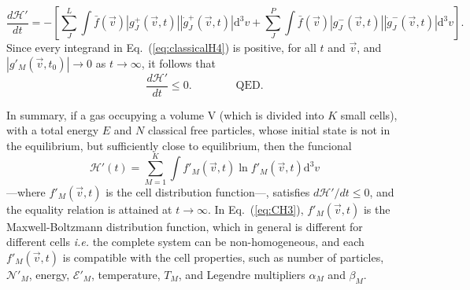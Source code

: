 %
\begin{equation}\label{eq:classicalH4}
    \frac{d\mathcal{H}'}{dt}=-\left[
      \sum_J^{L}\int\bar f(\vec{v})|g_J^{+}(\vec{v},t)|
        |\dot g_J^{+}(\vec{v},t)|\mathrm{d}^3v
      +\sum_J^{P}\int\bar f(\vec{v})|g_J^{-}(\vec{v},t)|
      |\dot g_J^{-}(\vec{v},t)|\mathrm{d}^3v 
    \right].
\end{equation}
%
Since every integrand in Eq.~(\ref{eq:classicalH4}) is positive,
for all $t$ and $\vec v$, and
$\left|g'_M(\vec{v},t_0)\right|\to 0$ as $t\to\infty$, it follows that
%
\begin{equation}\label{eq:dHpdtleq0}
 \frac{d\mathcal{H}'}{dt}\leq0.\qquad\qquad\textrm{QED.}
\end{equation}
%

In summary, if a gas occupying a volume V (which is divided into $K$ small cells), with a
total energy $E$ and $N$ classical free particles, whose initial state is not in the equilibrium,
but sufficiently close to equilibrium, then the funcional
%
\begin{equation}\label{eq:CH3}
   \mathcal{H}'(t)=\sum_{M=1}^{K}\int f'_M(\vec{v},t) \ln f'_M(\vec{v},t)\mathrm{d}^3v
\end{equation}
%
---where $f'_M(\vec{v},t)$ is the cell distribution function---,
satisfies $d\mathcal{H}'/dt\leq0$, and the equality relation is attained at $t\to\infty$.
In Eq.~(\ref{eq:CH3}), $f'_M(\vec{v},t)$ is the Maxwell-Boltzmann distribution
function, which in general is different for different cells \textit{i.e.} the complete system
can be non-homogeneous, and each $f'_M(\vec v,t)$ is compatible
with the cell properties, such as number of particles, $\mathcal{N}'_M$, energy, $\mathcal{E}'_M$, temperature,
$T_M$, and Legendre multipliers $\alpha_M$ and $\beta_M$. 


\begin{comment}
Joining both results, we can say the following statement:
Consider a classical gas in a total volume $V$ (divided in $K$ cells of equal
volume elements), total energy $E$ and total number of free particles $N$.
Consider also the system has inhomogeneities and suffers a relaxation process.
If we define the following functional
%
\begin{equation}\label{CH3}
   \mathcal{H}'(t)=\sum_{M=1}^{K}\int f_M(\vec{v},t) \ln f_M(\vec{v},t)\mathrm{d}^3v,
\end{equation}
%
where $f_M(\vec{v},t)$ is the local distribution function of each cell in the
system, then in the first-order approximation
%
\begin{equation}
    \frac{d\mathcal{H}'}{dt} \leq 0.
\end{equation}
%
This statement will be the classical $H$-theorem with inhomogeneities.

In the next section, we present a proposal quantum version of the
$H$-theorem defined by Tolman and our proposal quantum version of the $H$
theorem applying the method of the volume divided into cells.
\end{comment}


